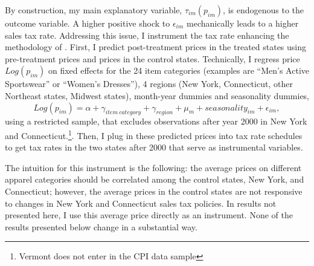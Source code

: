 \documentclass[12pt]{article}
\begin{document}
	By construction, my main explanatory variable, $\tau_{im}(p_{im})$, is endogenous to the outcome variable. A higher positive shock to $\epsilon_{im}$ mechanically leads to a higher sales tax rate. 
	Addressing this issue, I instrument the tax rate enhancing the methodology of \citep{hausman}. First, I predict post-treatment prices in the treated states using pre-treatment prices and prices in the control states. Technically, I regress price $Log(p_{im})$ on fixed effects for the 24 item categories (examples are ``Men's Active Sportswear'' or ``Women's Dresses''), 4 regions (New York, Connecticut, other Northeast states, Midwest states), month-year dummies and seasonality dummies,
	\begin{equation}
	\label{eq:pri}
	Log(p_{im}) = \alpha+\gamma_{item\ category}+\gamma_{region}+\mu_{m} +seasonality_{im}+\epsilon_{im},
	\end{equation} 
	using a restricted sample, that excludes observations after year 2000 in New York and Connecticut.\footnote{Vermont does not enter in the CPI data sample}. Then, I plug in these predicted prices into tax rate schedules to get tax rates in the two states after 2000 that serve as instrumental variables. 
	
	The intuition for this instrument is the following: the average prices on different apparel categories should be correlated among the control states, New York, and Connecticut; however, the average prices in the control states are not responsive to changes in New York and Connecticut sales tax policies. In results not presented here, I use this average price directly as an instrument. None of the results presented below change in a substantial way. 	
	
\end{document}
